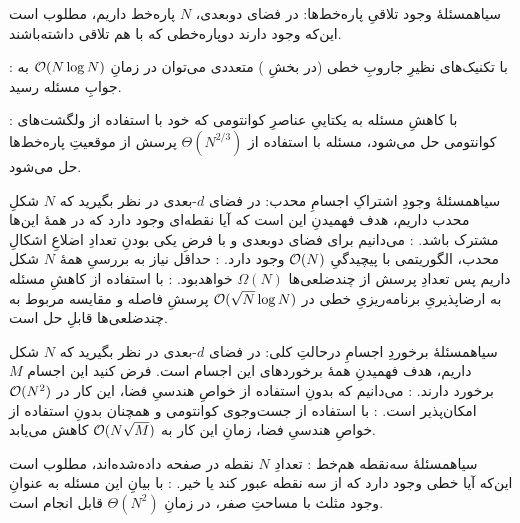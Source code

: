 
    ‌سیاه{مسئلهٔ وجود تلاقیِ پاره‌خط‌ها}: در فضای دوبعدی، $N$ پاره‌خط داریم، مطلوب است این‌که وجود دارند دوپاره‌خطی که با هم تلاقی داشته‌باشند.

        : با تکنیک‌های نظیرِ جاروبِ خطی (در بخشِ ) متعددی می‌توان در زمانِ 
        $\mathcal{O}(N\log N)$
        به جوابِ مسئله رسید.

        : با کاهشِ مسئله به یکتاییِ عناصرِ کوانتومی که خود با استفاده از ولگشت‌های کوانتومی حل می‌شود، مسئله با استفاده از
        $\Theta(N^{2/3})$
        پرسش از موقعیتِ پاره‌خط‌ها حل می‌شود.

    ‌سیاه{مسئلهٔ وجودِ اشتراکِ اجسامِ محدب}: در فضای $d$-بعدی در نظر بگیرید که $N$ شکلِ محدب داریم، هدف فهمیدنِ این است که آیا نقطه‌ای وجود دارد که در همهٔ این‌ها مشترک باشد. 
        : می‌دانیم برای فضای دوبعدی و با فرضِ یکی بودنِ تعدادِ اضلاعِ اشکالِ محدب، الگوریتمی با پیچیدگیِ
        $\mathcal{O}(N)$
        وجود دارد.
        : حداقل نیاز به بررسیِ همهٔ $N$ شکل داریم پس تعدادِ پرسش از چندضلعی‌ها 
        $\Omega(N)$
        خواهدبود.
        : با استفاده از کاهشِ مسئله به ارضاپذیریِ برنامه‌ریزیِ خطی در 
        $\mathcal{O}(\sqrt{N}\log N)$
        پرسشِ فاصله و مقایسه مربوط به چندضلعی‌ها قابلِ حل است.

    ‌سیاه{مسئلهٔ برخوردِ اجسامِ درحالتِ کلی}:
     در فضای $d$-بعدی در نظر بگیرید که $N$ شکل داریم، هدف فهمیدنِ همهٔ برخوردهای این اجسام است. فرض کنید این اجسام $M$ برخورد دارند. 
        : می‌دانیم که بدونِ استفاده از خواصِ هندسیِ فضا، این کار در 
        $\mathcal{O}(N^2)$
        امکان‌پذیر است.
        : با استفاده از جست‌وجوی کوانتومی و همچنان بدونِ استفاده از خواصِ هندسیِ فضا، زمانِ این کار به 
        $\mathcal{O}(N\sqrt{M})$
        کاهش می‌یابد.

    ‌سیاه{مسئلهٔ سه‌نقطه هم‌خط} : تعدادِ $N$ نقطه در صفحه داده‌شده‌اند، مطلوب است این‌که آیا خطی وجود دارد که از سه نقطه عبور کند یا خیر.   
        :
        با بیانِ این مسئله به عنوانِ وجود مثلث با مساحتِ صفر، در زمانِ 
        $\Theta(N^2)$
        قابل انجام است.
        
